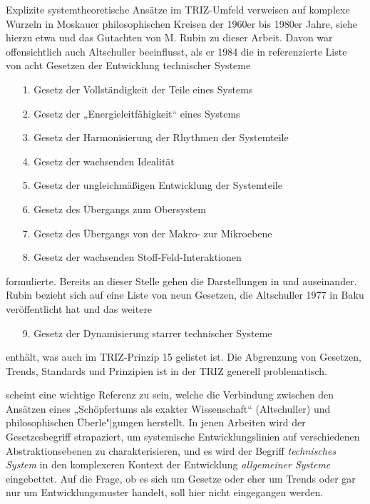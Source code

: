 \documentclass[12pt,a4paper]{article}
\begin{document}
Explizite systemtheoretische Ansätze im TRIZ-Umfeld verweisen auf komplexe
Wurzeln in Moskauer philosophischen Kreisen der 1960er bis 1980er Jahre, siehe
hierzu etwa \cite{Kozhemyako2019} und das Gutachten von M. Rubin zu dieser
Arbeit. Davon war offensichtlich auch Altschuller beeinflusst, als er 1984 die
in \cite{TESE2018} referenzierte Liste von acht Gesetzen der Entwicklung
technischer Systeme
\begin{itemize}\itemsep0pt
\item[1.] Gesetz der Vollständigkeit der Teile eines Systems
\item[2.] Gesetz der „Energieleitfähigkeit“ eines Systems
\item[3.] Gesetz der Harmonisierung der Rhythmen der Systemteile
\item[4.] Gesetz der wachsenden Idealität
\item[5.] Gesetz der ungleichmäßigen Entwicklung der Systemteile
\item[6.] Gesetz des Übergangs zum Obersystem
\item[7.] Gesetz des Übergangs von der Makro- zur Mikroebene
\item[8.] Gesetz der wachsenden Stoff-Feld-Interaktionen
\end{itemize}
formulierte. Bereits an dieser Stelle gehen die Darstellungen in
\cite{TESE2018} und \cite{Rubin2019} auseinander. Rubin bezieht sich auf eine
Liste von neun Gesetzen, die Altschuller 1977 in Baku veröffentlicht hat und
das weitere
\begin{itemize}\itemsep0pt
\item[9.] Gesetz der Dynamisierung starrer technischer Systeme
\end{itemize}
enthält, was auch im TRIZ-Prinzip 15 gelistet ist.  Die Abgrenzung von
Gesetzen, Trends, Standards und Prinzipien ist in der TRIZ generell
problematisch.

\cite{Goldovsky1983} scheint eine wichtige Referenz zu sein, welche die
Verbindung zwischen den Ansätzen eines „Schöpfertums als exakter Wissenschaft“
(Altschuller) und philosophischen Überle"|gungen herstellt. In jenen Arbeiten
wird der Gesetzesbegriff strapaziert, um systemische Entwicklungslinien auf
verschiedenen Abstraktionsebenen zu charakterisieren, und es wird der Begriff
\emph{technisches System} in den komplexeren Kontext der Entwicklung
\emph{allgemeiner Systeme} eingebettet.  Auf die Frage, ob es sich um Gesetze
oder eher um Trends oder gar nur um Entwicklungsmuster handelt, soll hier
nicht eingegangen werden.
\end{document}
